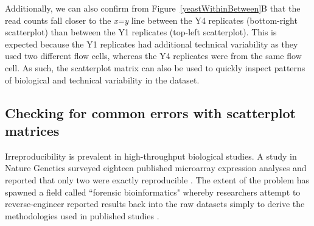 \documentclass[11pt,a4paper,oldfontcommands,openany]{memoir}
\numberwithin{equation}{section} %
\begin{document}
Additionally, we can also confirm from Figure~\ref{yeastWithinBetween}B that the read counts fall closer to the \textit{x=y} line between the Y4 replicates (bottom-right scatterplot) than between the Y1 replicates (top-left scatterplot). This is expected because the Y1 replicates had additional technical variability as they used two different flow cells, whereas the Y4 replicates were from the same flow cell. As such, the scatterplot matrix can also be used to quickly inspect patterns of biological and technical variability in the dataset.

\subsection{Checking for common errors with scatterplot matrices}

Irreproducibility is prevalent in high-throughput biological studies. A study in Nature Genetics surveyed eighteen published microarray expression analyses and reported that only two were exactly reproducible \citep{Ioannidis}. The extent of the problem has spawned a field called ``forensic bioinformatics" whereby researchers attempt to reverse-engineer reported results back into the raw datasets simply to derive the methodologies used in published studies \citep{Baggerly}.
\end{document}
